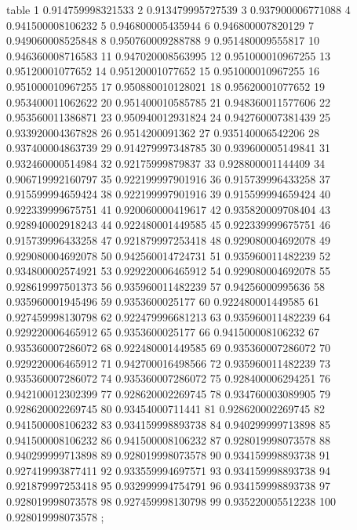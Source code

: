table {%
	1 0.914759998321533
	2 0.913479995727539
	3 0.937900006771088
	4 0.941500008106232
	5 0.946800005435944
	6 0.946800007820129
	7 0.949060008525848
	8 0.950760009288788
	9 0.951480009555817
	10 0.946360008716583
	11 0.947020008563995
	12 0.951000010967255
	13 0.95120001077652
	14 0.95120001077652
	15 0.951000010967255
	16 0.951000010967255
	17 0.950880010128021
	18 0.95620001077652
	19 0.953400011062622
	20 0.951400010585785
	21 0.948360011577606
	22 0.953560011386871
	23 0.950940012931824
	24 0.942760007381439
	25 0.933920004367828
	26 0.9514200091362
	27 0.935140006542206
	28 0.937400004863739
	29 0.914279997348785
	30 0.939600005149841
	31 0.932460000514984
	32 0.92175999879837
	33 0.928800001144409
	34 0.906719992160797
	35 0.922199997901916
	36 0.915739996433258
	37 0.915599994659424
	38 0.922199997901916
	39 0.915599994659424
	40 0.922339999675751
	41 0.920060000419617
	42 0.935820009708404
	43 0.928940002918243
	44 0.922480001449585
	45 0.922339999675751
	46 0.915739996433258
	47 0.921879997253418
	48 0.929080004692078
	49 0.929080004692078
	50 0.942560014724731
	51 0.935960011482239
	52 0.934800002574921
	53 0.929220006465912
	54 0.929080004692078
	55 0.928619997501373
	56 0.935960011482239
	57 0.94256000995636
	58 0.935960001945496
	59 0.9353600025177
	60 0.922480001449585
	61 0.927459998130798
	62 0.922479996681213
	63 0.935960011482239
	64 0.929220006465912
	65 0.9353600025177
	66 0.941500008106232
	67 0.935360007286072
	68 0.922480001449585
	69 0.935360007286072
	70 0.929220006465912
	71 0.942700016498566
	72 0.935960011482239
	73 0.935360007286072
	74 0.935360007286072
	75 0.928400006294251
	76 0.942100012302399
	77 0.928620002269745
	78 0.934760003089905
	79 0.928620002269745
	80 0.93454000711441
	81 0.928620002269745
	82 0.941500008106232
	83 0.934159998893738
	84 0.940299999713898
	85 0.941500008106232
	86 0.941500008106232
	87 0.928019998073578
	88 0.940299999713898
	89 0.928019998073578
	90 0.934159998893738
	91 0.927419993877411
	92 0.933559994697571
	93 0.934159998893738
	94 0.921879997253418
	95 0.932999994754791
	96 0.934159998893738
	97 0.928019998073578
	98 0.927459998130798
	99 0.935220005512238
	100 0.928019998073578
};
